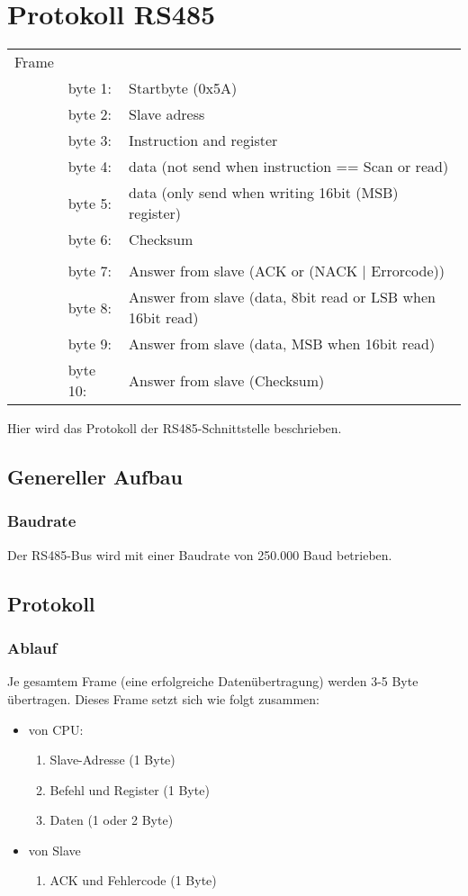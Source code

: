 \chapter{Protokoll RS485}

\begin{tabular}{lll}
Frame & & \\
&	byte 1:& 	Startbyte (0x5A) \\
&	byte 2:&	Slave adress \\
&	byte 3:& 	Instruction and register \\
&	byte 4:& 	data (not send when instruction == Scan or read) \\
&	byte 5:& 	data (only send when writing 16bit (MSB) register) \\
&	byte 6:& 	Checksum \\
&&	\\
&	byte 7:& 	Answer from slave (ACK or (NACK $\vert$ Errorcode)) \\
&	byte 8:& 	Answer from slave (data, 8bit read or LSB when 16bit read) \\
&	byte 9:& 	Answer from slave (data, MSB when 16bit read) \\
&	byte 10:& 	Answer from slave (Checksum) \\
\end{tabular}


Hier wird das Protokoll der RS485-Schnittstelle beschrieben.

\section{Genereller Aufbau}

\subsection{Baudrate}

Der RS485-Bus wird mit einer Baudrate von 250.000 Baud betrieben.

\section{Protokoll}
\subsection{Ablauf}
Je gesamtem Frame (eine erfolgreiche Datenübertragung) werden 3-5 Byte übertragen. Dieses Frame setzt sich wie folgt zusammen:
\begin{itemize}
    \item von CPU:
    \begin{enumerate}
        \item Slave-Adresse (1 Byte)
        \item Befehl und Register (1 Byte)
        \item Daten (1 oder 2 Byte)
    \end{enumerate}
    \item von Slave
    \begin{enumerate}
        \item ACK und Fehlercode (1 Byte)
    \end{enumerate}
\end{itemize}

